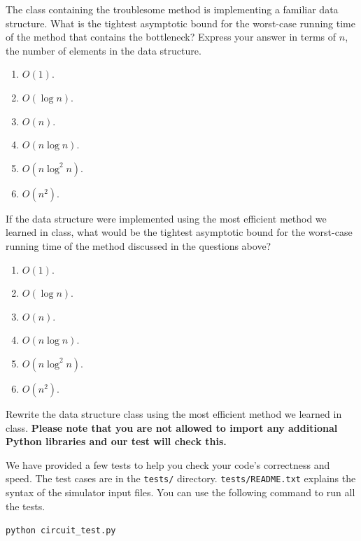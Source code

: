 \documentclass[12pt,twoside]{article}
\begin{document}
\begin{problems}
\begin{problemparts}
\problempart {} The class containing the troublesome method is
implementing a familiar data structure. What is the tightest asymptotic bound
for the worst-case running time of the method that contains the bottleneck?
Express your answer in terms of $n$, the number of elements in the data
structure.
\begin{enumerate}
  \item $O(1)$.
  \item $O(\log n)$.
  \item $O(n)$.
  \item $O(n \log n)$.
  \item $O(n \log^2 n)$.
  \item $O(n^2)$.
\end{enumerate}

\problempart {} If the data structure were implemented using the most
efficient method we learned in class, what would be the tightest asymptotic
bound for the worst-case running time of the method discussed in the questions
above?
\begin{enumerate}
  \item $O(1)$.
  \item $O(\log n)$.
  \item $O(n)$.
  \item $O(n \log n)$.
  \item $O(n \log^2 n)$.
  \item $O(n^2)$.
\end{enumerate}

\problempart {} Rewrite the data structure class using the most
efficient method we learned in class. \textbf{Please note that you are not
allowed to import any additional Python libraries and our test will check this.}

We have provided a few tests to help you check your code's correctness and
speed. The test cases are in the \texttt{tests/} directory.
\texttt{tests/README.txt} explains the syntax of the simulator input files. You
can use the following command to run all the tests.

\texttt{python circuit\_test.py}


\end{problemparts}
\end{problems}
\end{document}
